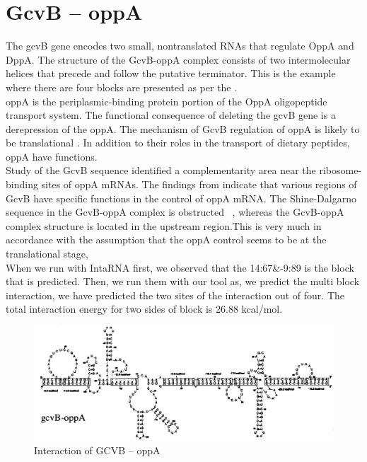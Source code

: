 \documentclass[twoside,a4paper]{report}
\begin{document}
\clearpage

	\section{GcvB – oppA }
    The gcvB gene encodes two small, nontranslated RNAs that regulate OppA and DppA. The structure of the GcvB-oppA complex consists of two intermolecular helices that precede and follow the putative terminator. This is the example where there are four blocks are presented as per the {\citep{pervouchine2004iris}} . \\ 
    
     oppA is the periplasmic-binding protein portion of the OppA oligopeptide transport system. The functional consequence of deleting the gcvB gene is a derepression of the oppA. The mechanism of GcvB regulation of oppA is likely to be translational \citep{urbanowski2000gcvb}. In addition to their roles in the transport of dietary peptides, oppA have functions.\\
    
    Study of the GcvB sequence identified a complementarity area near the ribosome-binding sites of oppA mRNAs. The findings from {\citep{pulvermacher2008role}} indicate that various regions of GcvB have specific functions in the control of oppA mRNA. The Shine-Dalgarno sequence in the GcvB-oppA complex is obstructed ~\citep{pervouchine2004iris}, whereas the GcvB-oppA complex structure is located in the upstream region.This is very much in accordance with the assumption that the oppA control seems to be at the translational stage, \\
    
    When we run with IntaRNA first, we observed that the 14:67\&-9:89 is the block that is predicted. Then, we run them with our tool as, we predict the multi block interaction, we have predicted the two sites of the interaction out of four. The total interaction energy for two sides of block is 26.88 kcal/mol. \\
	
		\begin{figure}[h!tb]
		\includegraphics[width=1.0\linewidth]{oppa}
		\centering
		\caption{ Interaction of GCVB – oppA } 
		\label{fig:oppa}
	\end{figure}
\end{document}

